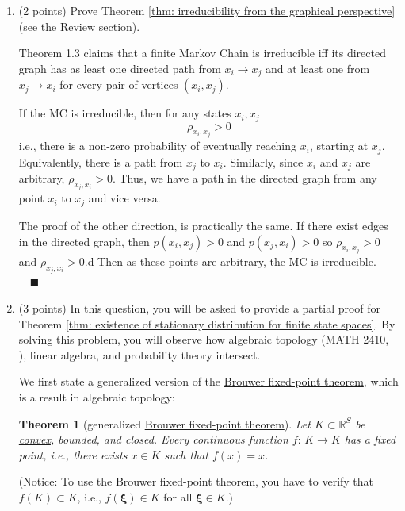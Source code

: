 \documentclass[11pt,letterpaper, leqno]{article}
\newtheorem{theorem}{Theorem}
\numberwithin{equation}{section}
\numberwithin{theorem}{section}
\numberwithin{lemma}{section}
\numberwithin{corollary}{section}
\numberwithin{definition}{section}
\numberwithin{proposition}{section}
\numberwithin{remark}{section}
\numberwithin{example}{section}
\renewcommand{\qed}{\quad \blacksquare}
\begin{document}
\begin{enumerate}

    \item (2 points) Prove Theorem \ref{thm: irreducibility from the graphical perspective} (see the Review section).
    
        \color{blue}
            Theorem 1.3 claims that a finite Markov Chain is irreducible iff its directed graph has as least one directed path from $x_i \to x_j$ and at least one from $x_j \to x_i$ for every pair of vertices $(x_i, x_j)$. 

            If the MC is irreducible, then for any states $x_i, x_j$ 
            \[\rho_{x_i, x_j} > 0\]  
            i.e., there is a non-zero probability of eventually reaching $x_i$, starting at $x_j$. Equivalently, there is a path from $x_j$ to $x_i$.  
            Similarly, since $x_i$ and $x_j$ are arbitrary, $\rho_{x_j, x_i} > 0$. Thus, we have a path in the directed graph from any point $x_i$ to $x_j$ and vice versa. 

            The proof of the other direction, is practically the same. If there exist edges in the directed graph, then $p(x_i, x_j) > 0$ and $p(x_j, x_i) > 0$ so $\rho_{x_i, x_j} > 0$ and $\rho_{x_j, x_i} > 0$.d Then as these points are arbitrary, the MC is irreducible. $\qed$
         \color{black}
    \pagebreak    

    \item (3 points) In this question, you will be asked to provide a partial proof for Theorem \ref{thm: existence of stationary distribution for finite state spaces}. By solving this problem, you will observe how algebraic topology (MATH 2410, \cite{hatcher2002algebraic}), linear algebra, and probability theory intersect.
    
    We first state a generalized version of the \href{https://en.wikipedia.org/wiki/Brouwer_fixed-point_theorem}{Brouwer fixed-point theorem}, which is a result in algebraic topology: 
    \begin{theorem}[generalized \href{https://en.wikipedia.org/wiki/Brouwer_fixed-point_theorem}{Brouwer fixed-point theorem}]\label{thm generalized Brouwer fixed-point theorem}
        Let $K\subset\mathbb{R}^S$ be \href{https://en.wikipedia.org/wiki/Convex_set}{convex}, bounded, and closed. Every continuous function $f:\, K\rightarrow K$ has a fixed point, i.e., there exists $x\in K $ such that $f(x)=x$.
    \end{theorem}
    
    (Notice: To use the Brouwer fixed-point theorem, you have to verify that $f(K)\subset K$, i.e., $f(\boldsymbol{\xi})\in K$ for all $\boldsymbol{\xi}\in K$.)
    

\end{enumerate}
\end{document}

